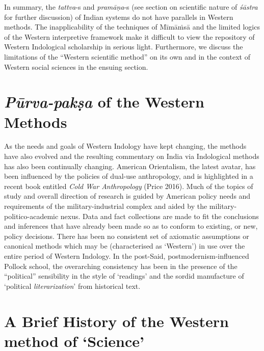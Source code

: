 In summary, the {\sl tattva}-s and {\sl pramāṇa}-s (see section on scientific nature of {\sl śāstra} for further discussion) of Indian systems do not have parallels in Western methods. The inapplicability of the techniques of Mīmāṁsā and the limited logics of the Western interpretive framework make it difficult to view the repository of Western Indological scholarship in serious light. Furthermore, we discuss the limitations of the ``Western scientific method'' on its own and in the context of Western social sciences in the ensuing section.\\[-20pt]

\section*{{{\sl\bfseries Pūrva-pakṣa}\relax} of the Western Methods}

As the needs and goals of Western Indology have kept changing, the methods have also evolved and the resulting commentary on India via Indological methods has also been continually changing. American Orientalism, the latest avatar, has been influenced by the policies of dual-use anthropology, and is highlighted in a recent book entitled {\sl Cold War Anthropology} (Price 2016). Much of the topics of study and overall direction of research is guided by American policy needs and requirements of the military-industrial complex and aided by the military-politico-academic nexus. Data and fact collections are made to fit the conclusions and inferences that have already been made so as to conform to existing, or new, policy decisions. There has been no consistent set of axiomatic assumptions or canonical methods which may be (characterised as `Western') in use over the entire period of Western Indology. In the post-Said, postmodernism-influenced Pollock school, the overarching consistency has been in the presence of the ``political'' sensibility in the style of `readings' and the sordid manufacture of `political {\sl literarization}' from historical text.

\section*{A Brief History of the Western method of `Science'}

